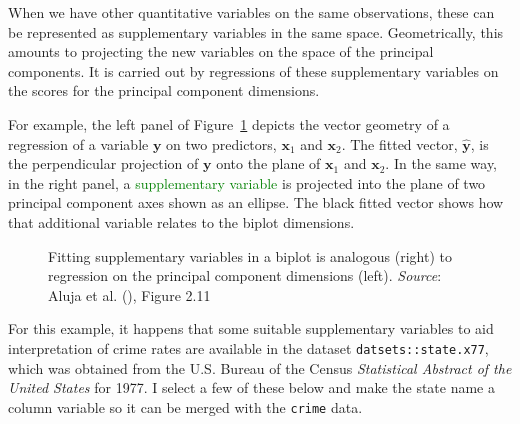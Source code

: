 \documentclass[
  letterpaper,
  10pt,
  krantz2]{krantz}
\begin{document}
When we have other quantitative variables on the same observations,
these can be represented as supplementary variables in the same space.
Geometrically, this amounts to projecting the new variables on the space
of the principal components. It is carried out by regressions of these
supplementary variables on the scores for the principal component
dimensions.

For example, the left panel of Figure~\ref{fig-supp-regession} depicts
the vector geometry of a regression of a variable \(\mathbf{y}\) on two
predictors, \(\mathbf{x}_1\) and \(\mathbf{x}_2\). The fitted vector,
\(\widehat{\mathbf{y}}\), is the perpendicular projection of
\(\mathbf{y}\) onto the plane of \(\mathbf{x}_1\) and \(\mathbf{x}_2\).
In the same way, in the right panel, a
\textcolor{green}{supplementary variable} is projected into the plane of
two principal component axes shown as an ellipse. The black fitted
vector shows how that additional variable relates to the biplot
dimensions.

\begin{figure}


\caption{\label{fig-supp-regession}Fitting supplementary variables in a
biplot is analogous (right) to regression on the principal component
dimensions (left). \emph{Source}: Aluja et al.
(), Figure 2.11}

\end{figure}%

For this example, it happens that some suitable supplementary variables
to aid interpretation of crime rates are available in the dataset
\texttt{datsets::state.x77}, which was obtained from the U.S. Bureau of
the Census \emph{Statistical Abstract of the United States} for 1977. I
select a few of these below and make the state name a column variable so
it can be merged with the \texttt{crime} data.
\end{document}
